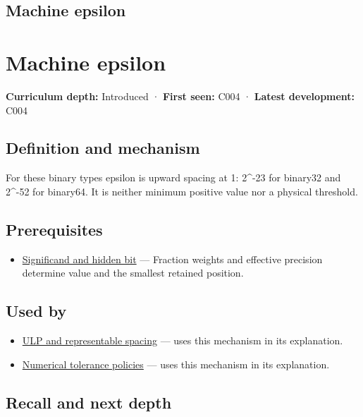 \hypertarget{appendix-390ea641da54}{}
\section*{Machine epsilon}
\chapter{Machine epsilon}\label{appendix-390ea641da54-machine-epsilon}

\textbf{Curriculum depth:} Introduced · \textbf{First seen:} C004 · \textbf{Latest development:} C004

\section{Definition and mechanism}\label{appendix-390ea641da54-definition-and-mechanism}

For these binary types epsilon is upward spacing at 1: 2\^{}-23 for binary32 and 2\^{}-52 for binary64. It is neither minimum positive value nor a physical threshold.

\section{Prerequisites}\label{appendix-390ea641da54-prerequisites}

\begin{itemize}
\tightlist
\item
  \hyperref[appendix-a24fd710cf67]{Significand and hidden bit} --- Fraction weights and effective precision determine value and the smallest retained position.
\end{itemize}

\section{Used by}\label{appendix-390ea641da54-used-by}

\begin{itemize}
\tightlist
\item
  \hyperref[appendix-14bab4cab9d4]{ULP and representable spacing} --- uses this mechanism in its explanation.
\item
  \hyperref[appendix-0ec599f8ba27]{Numerical tolerance policies} --- uses this mechanism in its explanation.
\end{itemize}

\section{Recall and next depth}\label{appendix-390ea641da54-recall-and-next-depth}

